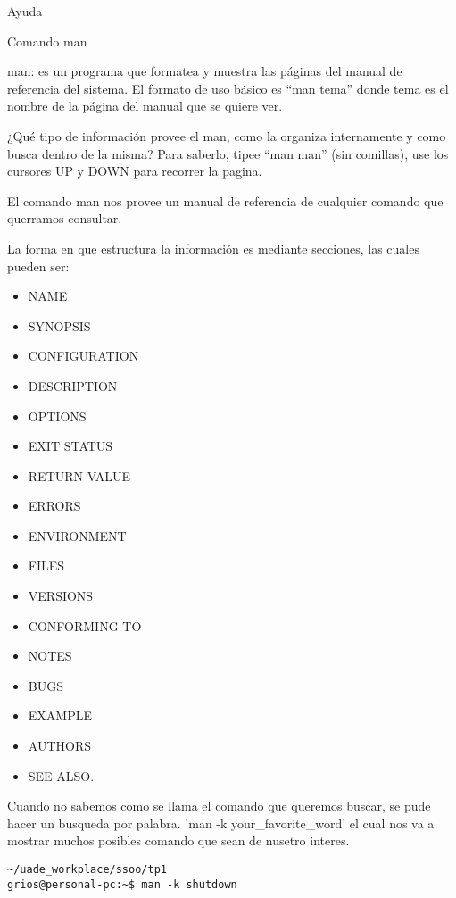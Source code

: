 \begin{section}{Ayuda}

\begin{subsection}{Comando man}

\begin{quoting}
man: es un programa que formatea y muestra las páginas del manual de referencia del sistema. El
formato de uso básico es “man tema” donde tema es el nombre de la página del manual que se quiere ver.
\end{quoting}

\begin{quoting}
¿Qué tipo de información provee el man, como la organiza internamente y como busca dentro de la misma? Para saberlo, tipee “man man” (sin comillas), use los cursores UP y DOWN para recorrer la pagina.
\end{quoting}
El comando man nos provee un manual de referencia de cualquier comando que querramos consultar. 

La forma en que estructura la información es mediante secciones, las cuales pueden ser:
\begin{itemize}
\item NAME
\item SYNOPSIS
\item CONFIGURATION 
\item DESCRIPTION 
\item OPTIONS
\item EXIT STATUS 
\item RETURN VALUE
\item ERRORS 
\item ENVIRONMENT
\item FILES
\item VERSIONS
\item CONFORMING TO
\item NOTES
\item BUGS
\item EXAMPLE 
\item AUTHORS
\item SEE ALSO.
\end{itemize}

Cuando no sabemos como se llama el comando que queremos buscar, se pude hacer un busqueda por palabra. 'man -k your\_favorite\_word' el cual nos va a mostrar muchos posibles comando que sean de nusetro interes. 

\begin{lstlisting}[style=Ubuntu]
~/uade_workplace/ssoo/tp1
grios@personal-pc:~$ man -k shutdown


\end{lstlisting}
\end{subsection}
\end{section}
